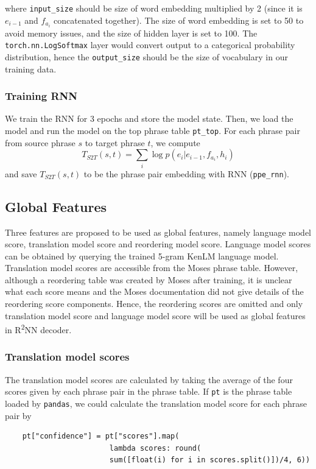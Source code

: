 \documentclass[12pt,a4paper,twoside,openright]{report}
\begin{document}
where \texttt{input\_size} should be size of word embedding multiplied by 2 (since it is $e_{i-1}$ and $f_{a_i}$ concatenated together). The size of word embedding is set to 50 to avoid memory issues, and the size of hidden layer is set to 100. The \texttt{torch.nn.LogSoftmax} layer would convert output to a categorical probability distribution, hence the \texttt{output\_size} should be the size of vocabulary in our training data.

\subsubsection{Training RNN}
We train the RNN for 3 epochs and store the model state. Then, we load the model and run the model on the top phrase table \texttt{pt\_top}. For each phrase pair from source phrase $s$ to target phrase $t$, we compute 
\[ T_{S2T}(s, t) = \sum_{i} \log p(e_i|e_{i-1}, f_{a_i}, h_i)\]
and save $T_{S2T}(s, t)$ to be the phrase pair embedding with RNN (\texttt{ppe\_rnn}). 

\subsection{Global Features} \label{global_features}
Three features are proposed to be used as global features, namely language model score, translation model score and reordering model score. Language model scores can be obtained by querying the trained 5-gram KenLM language model. Translation model scores are accessible from the Moses phrase table. However, although a reordering table was created by Moses after training, it is unclear what each score means and the Moses documentation did not give details of the reordering score components. Hence, the reordering scores are omitted and only translation model score and language model score will be used as global features in R\textsuperscript{2}NN decoder.

\subsubsection{Translation model scores}
The translation model scores are calculated by taking the average of the four scores given by each phrase pair in the phrase table. If \texttt{pt} is the phrase table loaded by \texttt{pandas}, we could calculate the translation model score for each phrase pair by

\begin{verbatim}
    pt["confidence"] = pt["scores"].map(
                        lambda scores: round(
                        sum([float(i) for i in scores.split()])/4, 6))
\end{verbatim}
\end{document}
